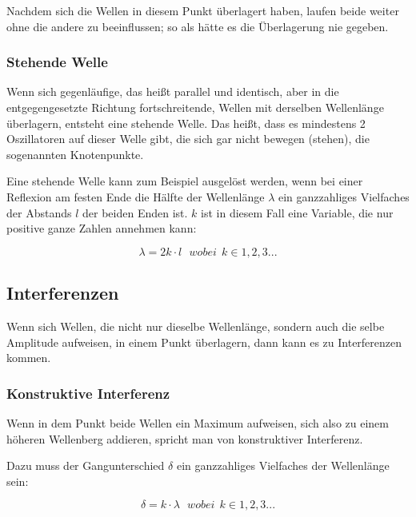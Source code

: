 Nachdem sich die Wellen in diesem Punkt überlagert haben, laufen beide weiter ohne die andere zu beeinflussen; so als hätte es die Überlagerung nie gegeben.

	\subsubsection{Stehende Welle}
	
	Wenn sich gegenläufige, das heißt parallel und identisch, aber in die entgegengesetzte Richtung fortschreitende, Wellen mit derselben Wellenlänge überlagern, entsteht eine stehende Welle. 
	Das heißt, dass es mindestens 2 Oszillatoren auf dieser Welle gibt, die sich gar nicht bewegen (\glqq stehen\grqq), die sogenannten Knotenpunkte.
	
	Eine stehende Welle kann zum Beispiel ausgelöst werden, wenn bei einer Reflexion am festen Ende die Hälfte der Wellenlänge $\lambda$ ein ganzzahliges Vielfaches der Abstands $l$ der beiden Enden ist. $k$ ist in diesem Fall eine Variable, die nur positive ganze Zahlen annehmen kann:
	
	\begin{equation} \label{stehendewelle}
		\lambda = 2k \cdot l \ \ \ wobei \ \ k \in 1,2,3...
	\end{equation}



\subsection{Interferenzen} \label{sec:interferenz}
Wenn sich Wellen, die nicht nur dieselbe Wellenlänge, sondern auch die selbe Amplitude aufweisen, in einem Punkt überlagern, dann kann es zu Interferenzen kommen.

	\subsubsection{Konstruktive Interferenz}
	
	Wenn in dem Punkt beide Wellen ein Maximum aufweisen, sich also zu einem höheren Wellenberg addieren, spricht man von konstruktiver Interferenz.
	
	Dazu muss der Gangunterschied $\delta$ ein ganzzahliges Vielfaches der Wellenlänge sein:
	
	\begin{equation}	\label{eq:kon_interferenz}
		\delta = k \cdot \lambda \ \ \ wobei \ \ k \in 1,2,3...
	\end{equation}
	
